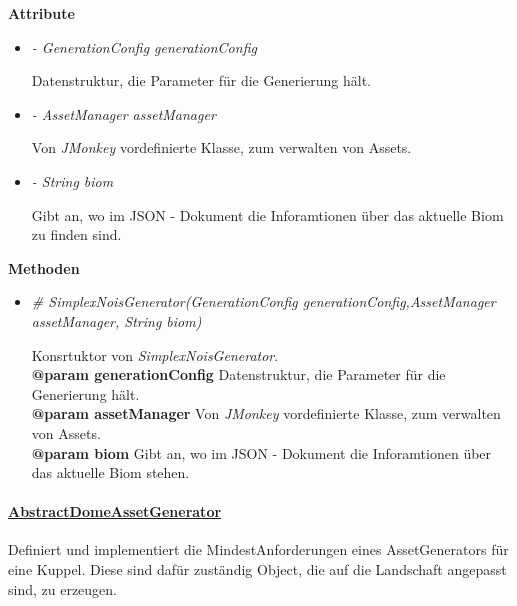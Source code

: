             \textbf{Attribute}
            \begin{itemize}
                \item  \textit{- GenerationConfig generationConfig} 
                    \begin{leftbar}[0.9\linewidth]
                        Datenstruktur, die Parameter für die Generierung hält.
                    \end{leftbar}

                \item  \textit{- AssetManager assetManager} 
                    \begin{leftbar}[0.9\linewidth]
                        Von \textit{JMonkey} vordefinierte Klasse, zum verwalten von Assets.
                    \end{leftbar}
                
                \item  \textit{- String biom} 
                    \begin{leftbar}[0.9\linewidth]
                        Gibt an, wo im JSON - Dokument die Inforamtionen über das aktuelle Biom zu finden sind.
                    \end{leftbar}
            \end{itemize}


            \textbf{Methoden}					
            \begin{itemize}
                \item  \textit{\# SimplexNoisGenerator(GenerationConfig generationConfig,AssetManager assetManager, String biom)}
                    \begin{leftbar}[0.9\linewidth]
                        Konsrtuktor von \textit{SimplexNoisGenerator}.\\
                        \textbf{@param generationConfig} Datenstruktur, die Parameter für die Generierung hält.\\
                        \textbf{@param assetManager} Von \textit{JMonkey} vordefinierte Klasse, zum verwalten von Assets.\\
                        \textbf{@param biom} Gibt an, wo im JSON - Dokument die Inforamtionen über das aktuelle Biom stehen.
                    \end{leftbar}   
            \end{itemize}
            
            
            
            \paragraph{\underline{AbstractDomeAssetGenerator}} \mbox{}\par
            Definiert und implementiert die MindestAnforderungen eines AssetGenerators für eine Kuppel. Diese sind dafür zuständig Object, 
            die auf die Landschaft angepasst sind, zu erzeugen.\par

